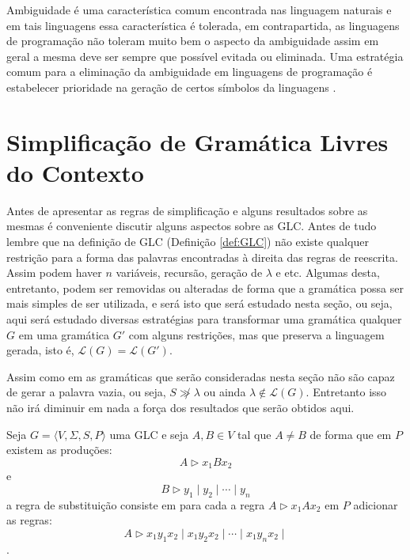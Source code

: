 Ambiguidade é uma característica comum encontrada nas linguagem naturais \cite{benjaLivro2010} e em tais linguagens essa característica é tolerada, em contrapartida, as linguagens de programação não toleram muito bem o aspecto da ambiguidade assim em geral a mesma deve ser sempre que possível evitada ou eliminada. Uma estratégia comum para a eliminação da ambiguidade em linguagens de programação é estabelecer prioridade na geração de certos símbolos da linguagens \cite{benjaLivro2010, aho2007}. 

\section{Simplificação de Gramática Livres do Contexto}\label{sec:SimplficacaoGLC}

Antes de apresentar as regras de simplificação e alguns resultados sobre as mesmas é conveniente discutir alguns aspectos sobre as GLC. Antes de tudo lembre que na definição de GLC (Definição \ref{def:GLC}) não existe qualquer restrição para a forma das palavras encontradas à direita das regras de reescrita. Assim podem haver $n$ variáveis, recursão, geração de $\lambda$ e etc. Algumas desta, entretanto, podem ser removidas ou alteradas de forma que a gramática possa ser mais simples de ser utilizada, e será isto que será estudado nesta seção, ou seja, aqui será estudado diversas estratégias para transformar uma gramática qualquer $G$ em uma gramática $G'$ com alguns restrições, mas que preserva a linguagem gerada, isto é, $\mathcal{L}(G) = \mathcal{L}(G')$. 

\begin{remark}
    Assim como em \cite{benjaLivro2010} as gramáticas que serão consideradas nesta seção não são capaz de gerar a palavra vazia, ou seja, $S \not\gg \lambda$ ou ainda $\lambda \notin \mathcal{L}(G)$. Entretanto isso não irá diminuir em nada a força dos resultados que serão obtidos aqui.
\end{remark}

\begin{definition}\label{def:RegraSubstituicao}
    Seja $G = \langle V, \Sigma, S, P\rangle$ uma GLC e seja $A, B \in V$ tal que $A \neq B$ de forma que em $P$ existem as produções:
    $$A \rhd x_1Bx_2$$
    e
    $$B \rhd y_1 \mid y_2 \mid \cdots \mid y_n$$
    a regra de substituição consiste em para cada a regra $A \rhd x_1A x_2$ em $P$ adicionar as regras:
    $$A \rhd x_1y_1x_2 \mid x_1y_2x_2 \mid \cdots \mid x_1y_nx_2 \mid$$.
\end{definition}

